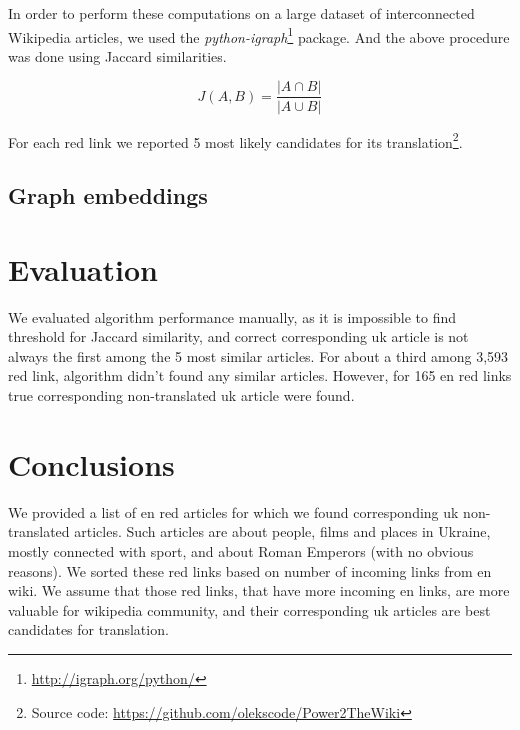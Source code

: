 \documentclass[11pt,a4paper]{article}
\begin{document}
In order to perform these computations on a large dataset of interconnected Wikipedia articles, we used the \textit{python-igraph}\footnote{\url{http://igraph.org/python/}} package. And the above procedure was done using Jaccard similarities.

\[ J(A, B) = \frac{|A \cap B|}{|A \cup B|} \]

For each red link we reported 5 most likely candidates for its translation\footnote{Source code: \url{https://github.com/olekscode/Power2TheWiki}}.

\subsection{Graph embeddings}

\section{Evaluation}

We evaluated algorithm performance manually, as it is impossible to find threshold for Jaccard similarity, and correct corresponding uk article is not always the first among the 5 most similar articles. For about a third among 3,593 red link, algorithm didn't found any similar articles. However, for 165 en red links true corresponding non-translated uk article were found.


\section{Conclusions}

We provided a list of en red articles for which we found corresponding uk non-translated articles. Such articles are about people, films and places in Ukraine, mostly connected with sport, and about Roman Emperors (with no obvious reasons). We sorted these red links based on number of incoming links from en wiki. We assume that those red links, that have more incoming en links, are more valuable for wikipedia community, and their corresponding uk articles are best candidates for translation.



\end{document}
